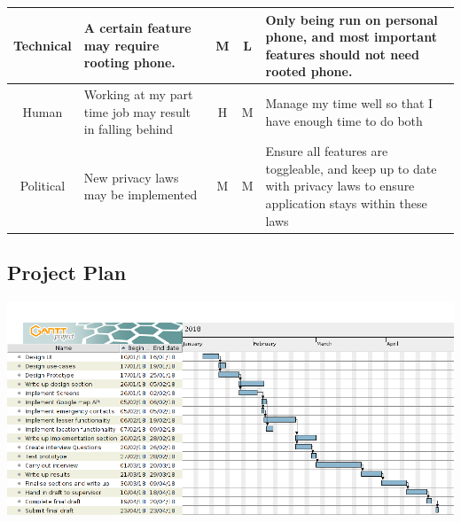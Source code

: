 \documentclass[a4paper]{report}
\begin{document}
\begin{center}
\begin{longtable}{|c|p{50mm}|c|c|p{50mm}|}
		\hline
		Technical & A certain feature may require rooting phone. & M & L & Only being run on personal phone, and most important features should not need rooted phone.\\
		\hline
		\hline
		Human & Working at my part time job may result in falling behind & H & M & Manage my time well so that I have enough time to do both\\
		\hline
		\hline
		Political & New privacy laws may be implemented & M & M & Ensure all features are toggleable, and keep up to date with privacy laws to ensure application stays within these laws\\
		\hline
	\end{longtable}
\end{center}
\begin{landscape}
	\section{Project Plan} 
	\label{sec:ProjectPlan}
	\includegraphics[width=200mm]{GanttChart.png}
\end{landscape}
\newpage
\end{document}
